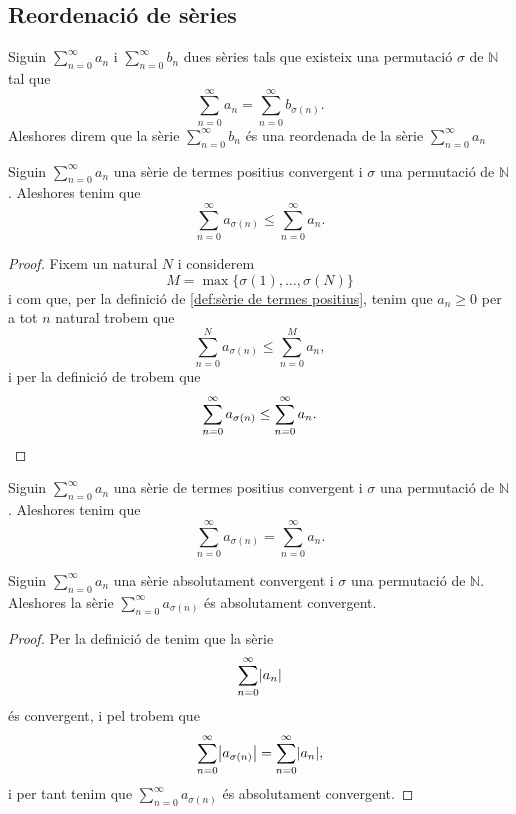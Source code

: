 \documentclass[../Apunts.tex]{subfiles}
\begin{document}
	\subsection{Reordenació de sèries}
	\begin{definition}
		\label{def:reordenada d'una sèrie}
		Siguin \(\sum_{n=0}^{\infty}a_{n}\) i \(\sum_{n=0}^{\infty}b_{n}\) dues sèries tals que existeix una permutació \(\sigma\) de \(\mathbb{N}\) tal que
		\[\sum_{n=0}^{\infty}a_{n}=\sum_{n=0}^{\infty}b_{\sigma(n)}.\]
		Aleshores direm que la sèrie \(\sum_{n=0}^{\infty}b_{n}\) és una reordenada de la sèrie \(\sum_{n=0}^{\infty}a_{n}\)
	\end{definition}
	\begin{lemma}
		\label{lema:la reordenada d'una sèrie de termes positius convergent és més petita que la sèrie}
		Siguin \(\sum_{n=0}^{\infty}a_{n}\) una sèrie de termes positius convergent i \(\sigma\) una permutació de \(\mathbb{N}\). Aleshores tenim que
		\[\sum_{n=0}^{\infty}a_{\sigma(n)}\leq\sum_{n=0}^{\infty}a_{n}.\]
		\begin{proof}
			Fixem un natural \(N\) i considerem
			\[M=\max\{\sigma(1),\dots,\sigma(N)\}\]
			i com que, per la definició de \ref{def:sèrie de termes positius}, tenim que \(a_{n}\geq0\) per a tot \(n\) natural trobem que
			\[\sum_{n=0}^{N}a_{\sigma(n)}\leq\sum_{n=0}^{M}a_{n},\]
			i per la definició de  trobem que
			\[\sum_{n=0}^{\infty}a_{\sigma(n)}\leq\sum_{n=0}^{\infty}a_{n}.\qedhere\]
		\end{proof}
	\end{lemma}
	\begin{corollary}
		\label{cor:la reordenada d'una sèrie de termes positius convergent conserva la sèrie}
		Siguin \(\sum_{n=0}^{\infty}a_{n}\) una sèrie de termes positius convergent i \(\sigma\) una permutació de \(\mathbb{N}\). Aleshores tenim que
		\[\sum_{n=0}^{\infty}a_{\sigma(n)}=\sum_{n=0}^{\infty}a_{n}.\]
	\end{corollary}
	\begin{proposition}
		\label{prop:la reordenada d'una sèrie absolutament convergent és absolutament convergent}
		Siguin \(\sum_{n=0}^{\infty}a_{n}\) una sèrie absolutament convergent i \(\sigma\) una permutació de \(\mathbb{N}\). Aleshores la sèrie \(\sum_{n=0}^{\infty}a_{\sigma(n)}\) és absolutament convergent.
		\begin{proof}
			Per la definició de  tenim que la sèrie
			\[\sum_{n=0}^{\infty}\abs{a_{n}}\]
			és convergent, i pel \corollari {} trobem que
			\[\sum_{n=0}^{\infty}\abs{a_{\sigma(n)}}=\sum_{n=0}^{\infty}\abs{a_{n}},\]
			i per tant tenim que \(\sum_{n=0}^{\infty}a_{\sigma(n)}\) és absolutament convergent.
		\end{proof}
	\end{proposition}
\end{document}
